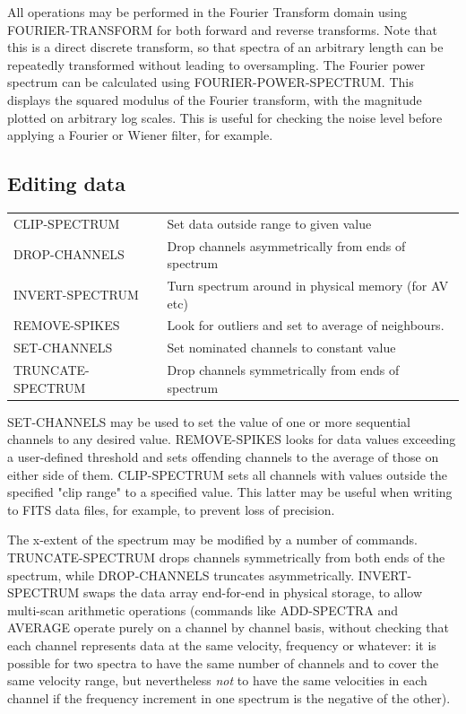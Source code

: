 \documentclass[11pt,twoside]{report}
\begin{document}
All operations may be performed in the Fourier Transform  domain using
FOURIER-TRANSFORM for both forward and reverse transforms. Note that this is a
direct discrete transform, so that spectra of an arbitrary length can be
repeatedly transformed without leading to oversampling. The Fourier power
spectrum can be calculated using FOURIER-POWER-SPECTRUM.  This displays the squared modulus of the Fourier
transform, with the magnitude plotted on arbitrary log scales. This is useful
for checking the noise level before applying a Fourier or Wiener filter, for
  example. 

\subsection{Editing data} 

\begin{tabular}{ll}
CLIP-SPECTRUM            & Set data outside range to given value\\
DROP-CHANNELS            & Drop channels asymmetrically from ends of spectrum\\
INVERT-SPECTRUM          & Turn spectrum around in physical memory (for AV etc)\\
REMOVE-SPIKES            & Look for outliers and set to average of neighbours.\\
SET-CHANNELS             & Set nominated channels to constant value\\
TRUNCATE-SPECTRUM        & Drop channels symmetrically from ends of spectrum\\
\end{tabular}


SET-CHANNELS may be used to set the value of one or more sequential channels
to any desired value. REMOVE-SPIKES looks for data values exceeding a user-defined
threshold and sets offending channels to the average of those on either side
of them. CLIP-SPECTRUM sets all channels with values outside the specified
"clip range" to a specified value. This latter may be useful when writing to
FITS data files, for example, to prevent loss of precision.

The x-extent of the spectrum may be modified by a number of commands.
TRUNCATE-SPECTRUM drops channels symmetrically from both ends of the spectrum,
while DROP-CHANNELS truncates asymmetrically. 
INVERT-SPECTRUM swaps the data array end-for-end in physical storage, to allow
multi-scan arithmetic operations (commands like ADD-SPECTRA and AVERAGE operate
 
purely on a channel by channel basis, without checking that each channel
represents data at the same velocity, frequency or whatever: it is possible for
two spectra to have the same number of channels and to cover the same velocity
range, but nevertheless {\em not} to have the same velocities in each channel
if the frequency increment in one spectrum is the negative of the other).
\end{document}
